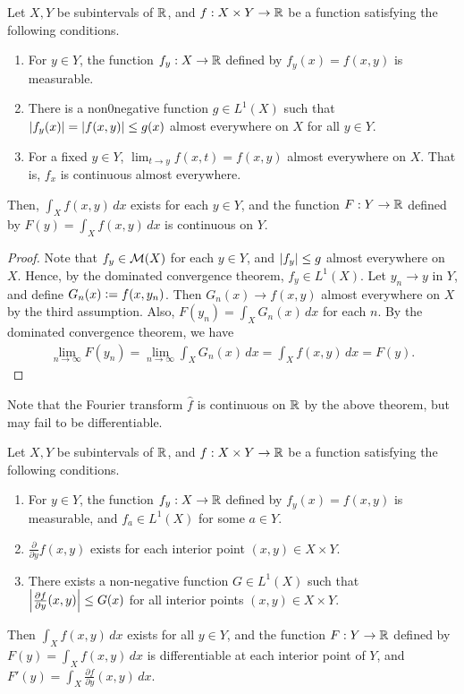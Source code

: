 \begin{theorem}
    Let $X,Y$ be subintervals of $\mathbb{R}$, and $f:X \times Y \to \mathbb{R}$ be a function satisfying the following conditions.
    \begin{enumerate}
        \item For $y \in Y$, the function $f_{y}:X \to \mathbb{R}$ defined by $f_{y}(x) = f(x,y)$ is measurable.
        \item There is a non0negative function $g \in L^{1}(X)$ such that $\left| f_{y}(x) \right| = \left| f(x,y) \right| \leq g(x)$ almost everywhere on $X$ for all $y \in Y$.
        \item For a fixed $y \in Y$, $\lim_{t \to y} f(x,t) = f(x,y)$ almost everywhere on $X$. That is, $f_{x}$ is continuous almost everywhere.
    \end{enumerate}
    Then, $\int_{X} f(x,y) \, dx$ exists for each $y \in Y$, and the function $F:Y \to \mathbb{R}$ defined by $F(y) = \int_{X} f(x,y) \, dx$ is continuous on $Y$.
\end{theorem}
\begin{proof}
    Note that $f_{y} \in \mathcal{M}(X)$ for each $y \in Y$, and $\left| f_{y} \right| \leq g$ almost everywhere on $X$. Hence, by the dominated convergence theorem, $f_{y} \in L^{1}(X)$. Let $y_{n} \to y$ in $Y$, and define $G_{n}(x) \vcentcolon= f(x,y_{n})$. Then $G_{n}(x) \to f(x,y)$ almost everywhere on $X$ by the third assumption. Also, $F(y_{n}) = \int_{X} G_{n}(x) \, dx$ for each $n$. By the dominated convergence theorem, we have
    \begin{align}
        \lim_{n \to \infty} F(y_{n}) = \lim_{n \to \infty} \int_{X} G_{n}(x) \, dx = \int_{X} f(x,y) \, dx = F(y).
    \end{align}
\end{proof}

Note that the Fourier transform $\hat{f}$ is continuous on $\mathbb{R}$ by the above theorem, but may fail to be differentiable.

\begin{theorem}
    Let $X,Y$ be subintervals of $\mathbb{R}$, and $f:X \times Y \to \mathbb{R}$ be a function satisfying the following conditions.
    \begin{enumerate}
        \item For $y \in Y$, the function $f_{y}:X \to \mathbb{R}$ defined by $f_{y}(x) = f(x,y)$ is measurable, and $f_{a} \in L^{1}(X)$ for some $a \in Y$.
        \item $\frac{\partial}{\partial y}f(x,y)$ exists for each interior point $(x,y) \in X \times Y$.
        \item There exists a non-negative function $G \in L^{1}(X)$ such that $\left| \frac{\partial f}{\partial y}(x,y) \right| \leq G(x)$ for all interior points $(x,y) \in X \times Y$.
    \end{enumerate}
    Then $\int_{X}f(x,y) \, dx$ exists for all $y \in Y$, and the function $F:Y \to \mathbb{R}$ defined by $F(y) = \int_{X} f(x,y) \, dx$ is differentiable at each interior point of $Y$, and $F'(y) = \int_{X} \frac{\partial f}{\partial y}(x,y) \, dx$.
\end{theorem}

